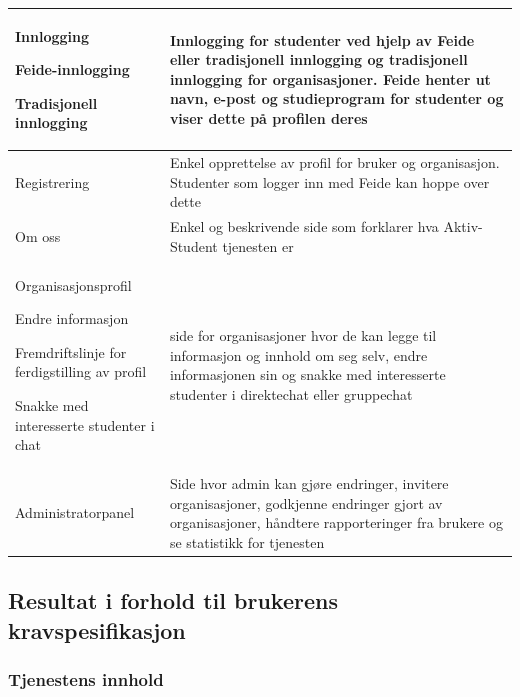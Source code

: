 \begin{center}
\begin{longtabu}{|X|X|}
Innlogging
\begin{compactitem}
    \item Feide-innlogging
    \item Tradisjonell innlogging
\end{compactitem}
& Innlogging for studenter ved hjelp av Feide eller tradisjonell innlogging og tradisjonell innlogging for organisasjoner. Feide henter ut navn, e-post og studieprogram for studenter og viser dette på profilen deres \\ \hline

Registrering 
& Enkel opprettelse av profil for bruker og organisasjon. Studenter som logger inn med Feide kan hoppe over dette \\ \hline

Om oss 
& Enkel og beskrivende side som forklarer hva Aktiv-Student tjenesten er  \\ \hline

Organisasjonsprofil 
\begin{compactitem}
    \item Endre informasjon
    \item Fremdriftslinje for ferdigstilling av profil
    \item Snakke med interesserte studenter i chat
\end{compactitem}
& side for organisasjoner hvor de kan legge til informasjon og innhold om seg selv, endre informasjonen sin og snakke med interesserte studenter i direktechat eller gruppechat  \\ \hline

Administratorpanel 
& Side hvor admin kan gjøre endringer, invitere organisasjoner, godkjenne endringer gjort av organisasjoner, håndtere rapporteringer fra brukere og se statistikk for tjenesten \\ \hline



\end{longtabu}
\end{center}

\subsection{Resultat i forhold til brukerens kravspesifikasjon}

\subsubsection{Tjenestens innhold}

